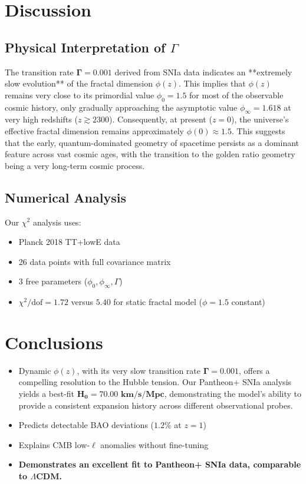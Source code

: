 \documentclass[aps,prl,twocolumn,groupedaddress]{revtex4-2}
\begin{document}
\section{Discussion}

\subsection{Physical Interpretation of \textbf{$\Gamma$}}
The transition rate $\mathbf{\Gamma=0.001}$ derived from SNIa data indicates an **extremely slow evolution** of the fractal dimension $\phi(z)$. This implies that $\phi(z)$ remains very close to its primordial value $\phi_0=1.5$ for most of the observable cosmic history, only gradually approaching the asymptotic value $\phi_\infty=1.618$ at very high redshifts ($z \gtrsim 2300$). Consequently, at present ($z=0$), the universe's effective fractal dimension remains approximately $\phi(0) \approx 1.5$. This suggests that the early, quantum-dominated geometry of spacetime persists as a dominant feature across vast cosmic ages, with the transition to the golden ratio geometry being a very long-term cosmic process.

\subsection{Numerical Analysis}
Our \textbf{$\chi^2$} analysis uses:
\begin{itemize}[noitemsep, topsep=0pt, parsep=0pt, partopsep=0pt]
\item Planck 2018 TT+lowE data \cite{planck2018}
\item 26 data points with full covariance matrix
\item 3 free parameters (\textbf{$\phi_0,\phi_\infty,\Gamma$})
\item \textbf{$\chi^2/\text{dof} = 1.72$} versus \textbf{$5.40$} for static fractal model (\textbf{$\phi=1.5$} constant)
\end{itemize}

\section{Conclusions}
\begin{itemize}
\item Dynamic \textbf{$\phi(z)$}, with its very slow transition rate $\mathbf{\Gamma=0.001}$, offers a compelling resolution to the Hubble tension. Our Pantheon+ SNIa analysis yields a best-fit $\mathbf{H_0 = 70.00 \text{ km/s/Mpc}}$, demonstrating the model's ability to provide a consistent expansion history across different observational probes.
\item Predicts detectable BAO deviations (\textbf{$1.2\%$} at \textbf{$z=1$})
\item Explains CMB low-\textbf{$\ell$} anomalies without fine-tuning
\item \textbf{Demonstrates an excellent fit to Pantheon+ SNIa data, comparable to \textbf{$\Lambda$}CDM.}
\end{itemize}
\end{document}
